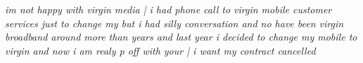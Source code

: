 \textit{im not happy with virgin media | i had phone call to virgin mobile customer services just to change my but i had silly conversation and no have been virgin broadband around more than years and last year i decided to change my mobile to virgin and now i am realy p off with your | i want my contract cancelled}